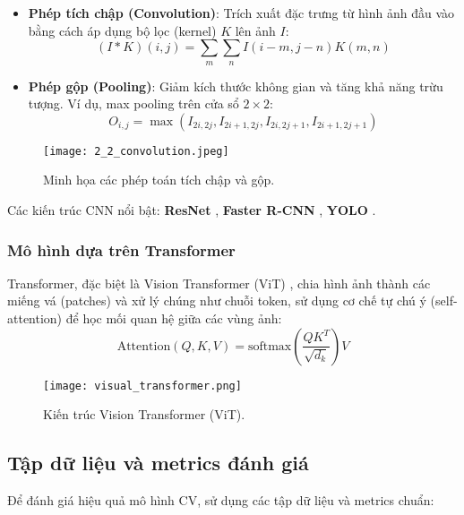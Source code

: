 \begin{itemize}
    \item \textbf{Phép tích chập (Convolution)}: Trích xuất đặc trưng từ hình ảnh đầu vào bằng cách áp dụng bộ lọc (kernel) $K$ lên ảnh $I$:
    \begin{equation}
    (I * K)(i, j) = \sum_{m} \sum_{n} I(i-m, j-n) K(m, n)
    \end{equation}

    \item \textbf{Phép gộp (Pooling)}: Giảm kích thước không gian và tăng khả năng trừu tượng. Ví dụ, max pooling trên cửa sổ $2 \times 2$:
    \begin{equation}
    O_{i,j} = \max \left( I_{2i, 2j}, I_{2i+1, 2j}, I_{2i, 2j+1}, I_{2i+1, 2j+1} \right)
    \end{equation}
\end{itemize}

\begin{figure}[h]
    \centering
    \texttt{[image: 2\_2\_convolution.jpeg]}
    \caption{Minh họa các phép toán tích chập và gộp.}
    \label{fig:cnn_ops}
\end{figure}

Các kiến trúc CNN nổi bật: \textbf{ResNet} \cite{he2016deep}, \textbf{Faster R-CNN} \cite{ren2015faster}, \textbf{YOLO} \cite{redmon2016you}.  

\subsubsection{Mô hình dựa trên Transformer}
Transformer, đặc biệt là Vision Transformer (ViT) \cite{dosovitskiy2021image}, chia hình ảnh thành các miếng vá (patches) và xử lý chúng như chuỗi token, sử dụng cơ chế tự chú ý (self-attention) để học mối quan hệ giữa các vùng ảnh:
\begin{equation}
\text{Attention}(Q, K, V) = \text{softmax}\left(\frac{QK^T}{\sqrt{d_k}}\right)V
\end{equation}

\begin{figure}[h]
    \centering
    \texttt{[image: visual\_transformer.png]}
    \caption{Kiến trúc Vision Transformer (ViT).}
    \label{fig:vit_arch}
\end{figure}

\subsection{Tập dữ liệu và metrics đánh giá}
Để đánh giá hiệu quả mô hình CV, sử dụng các tập dữ liệu và metrics chuẩn:

